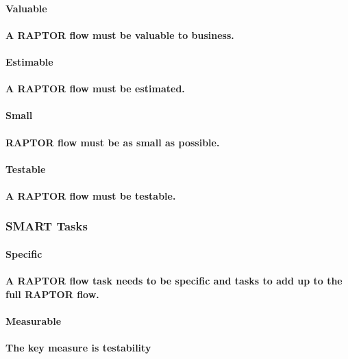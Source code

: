 \documentclass{acm_proc_article-sp}
\begin{document}
\paragraph{\textbf{Valuable}}
\paragraph{A RAPTOR flow must be valuable to business.}
\paragraph{\textbf{Estimable}}
\paragraph{A RAPTOR flow must be estimated.}
\paragraph{\textbf{Small}}
\paragraph{RAPTOR flow must be as small as possible.}
\paragraph{\textbf{Testable}}
\paragraph{A RAPTOR flow must be testable.}
\subsubsection{SMART Tasks}
\paragraph{\textbf{Specific}}
\paragraph{A RAPTOR flow task needs to be specific and tasks to add up to the full RAPTOR flow.}
\paragraph{\textbf{Measurable}}
\paragraph{The key measure is testability}
\end{document}
